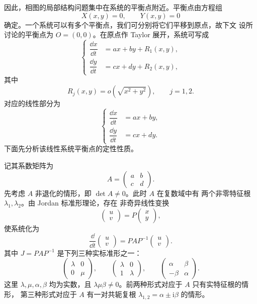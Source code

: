 因此，相图的局部结构问题集中在系统的平衡点附近。平衡点由方程组
\[
	X(x,y)=0,
	\qquad
	Y(x,y)=0
\]
确定。一个系统可以有多个平衡点，我们可分别将它们平移到原点，故下文
设所讨论的平衡点为 $O=(0,0)$。在原点作 Taylor 展开，系统可写成
\[
	\left\{
	\begin{aligned}
		\dfrac{\dd x}{\dd t}&=ax+by+R_1(x,y),\\
		\dfrac{\dd y}{\dd t}&=cx+dy+R_2(x,y),
	\end{aligned}
	\right.
\]
其中
\[
	R_j(x,y)=o\!\left(\sqrt{x^2+y^2}\right),
	\qquad j=1,2.
\]
对应的线性部分为
\[
	\left\{
	\begin{aligned}
		\dfrac{\dd x}{\dd t}&=ax+by,\\
		\dfrac{\dd y}{\dd t}&=cx+dy.
	\end{aligned}
	\right.
\]
下面先分析该线性系统平衡点的定性性质。

记其系数矩阵为
\[
	A=\begin{pmatrix}a&b\\c&d\end{pmatrix}.
\]
先考虑 $A$ 非退化的情形，即 $\det A\neq0$。此时 $A$ 在复数域中有
两个非零特征根 $\lambda_1,\lambda_2$。由 Jordan 标准形理论，存在
非奇异线性变换
\[
	\begin{pmatrix}u\\v\end{pmatrix}
	=P\begin{pmatrix}x\\y\end{pmatrix},
\]
使系统化为
\[
	\dfrac{\dd}{\dd t}\begin{pmatrix}u\\v\end{pmatrix}
	=PAP^{-1}\begin{pmatrix}u\\v\end{pmatrix}.
\]
其中 $J=PAP^{-1}$ 是下列三种实标准形之一：
\[
	\begin{pmatrix}\lambda&0\\0&\mu\end{pmatrix},
	\qquad
	\begin{pmatrix}\lambda&0\\1&\lambda\end{pmatrix},
	\qquad
	\begin{pmatrix}\alpha&\beta\\-\beta&\alpha\end{pmatrix}.
\]
这里 $\lambda,\mu,\alpha,\beta$ 均为实数，且
$\lambda\mu\beta\neq0$。前两种形式对应于 $A$ 只有实特征根的情形，
第三种形式对应于 $A$ 有一对共轭复根
$\lambda_{1,2}=\alpha\pm\mathrm{i}\beta$ 的情形。

